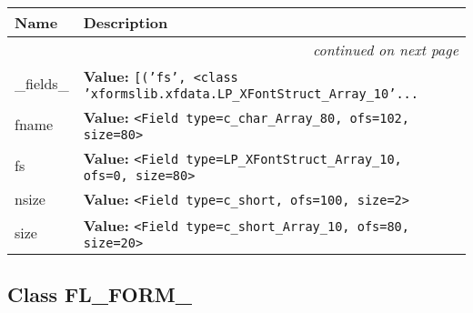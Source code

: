     \vspace{-1cm}
\hspace{\varindent}\begin{longtable}{|p{\varnamewidth}|p{\vardescrwidth}|l}
\cline{1-2}
\cline{1-2} \centering \textbf{Name} & \centering \textbf{Description}& \\
\cline{1-2}
\endhead\cline{1-2}\multicolumn{3}{r}{\small\textit{continued on next page}}\\\endfoot\cline{1-2}
\endlastfoot\raggedright \_\-f\-i\-e\-l\-d\-s\-\_\- & \raggedright \textbf{Value:} 
{\tt \texttt{[}\texttt{(}\texttt{'}\texttt{fs}\texttt{'}\texttt{, }{\textless}class 'xformslib.xfdata.LP\_XFontStruct\_Array\_10'\texttt{...}}&\\
\cline{1-2}
\raggedright f\-n\-a\-m\-e\- & \raggedright \textbf{Value:} 
{\tt {\textless}Field type=c\_char\_Array\_80, ofs=102, size=80{\textgreater}}&\\
\cline{1-2}
\raggedright f\-s\- & \raggedright \textbf{Value:} 
{\tt {\textless}Field type=LP\_XFontStruct\_Array\_10, ofs=0, size=80{\textgreater}}&\\
\cline{1-2}
\raggedright n\-s\-i\-z\-e\- & \raggedright \textbf{Value:} 
{\tt {\textless}Field type=c\_short, ofs=100, size=2{\textgreater}}&\\
\cline{1-2}
\raggedright s\-i\-z\-e\- & \raggedright \textbf{Value:} 
{\tt {\textless}Field type=c\_short\_Array\_10, ofs=80, size=20{\textgreater}}&\\
\cline{1-2}
\end{longtable}



\subsection{Class FL\_FORM\_}


